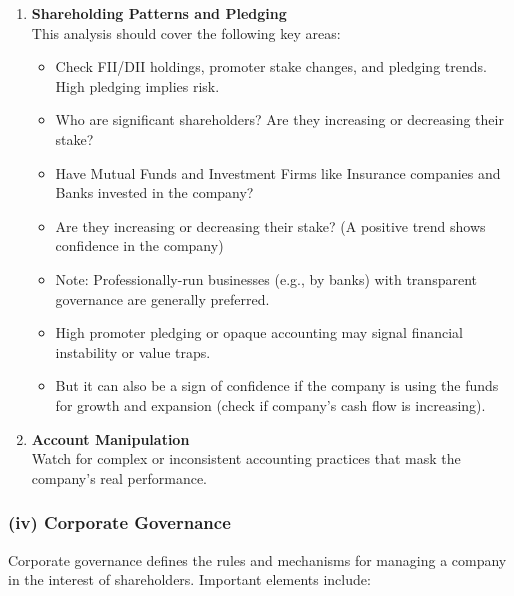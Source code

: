 \documentclass[12pt]{article}
\begin{document}
\begin{enumerate}
    \item \textbf{Shareholding Patterns and Pledging} \\
    This analysis should cover the following key areas:
    \begin{itemize}
      \item Check FII/DII holdings, promoter stake changes, and pledging trends. High pledging implies risk. 
      \item Who are significant shareholders? Are they increasing or decreasing their stake?
      \item Have Mutual Funds and Investment Firms like Insurance companies and Banks invested in the company?
      \item Are they increasing or decreasing their stake? (A positive trend shows confidence in the company)
      \item Note: Professionally-run businesses (e.g., by banks) with transparent governance are generally preferred.
      \item High promoter pledging or opaque accounting may signal financial instability or value traps.
      \item But it can also be a sign of confidence if the company is using the funds for growth and expansion (check if company's cash flow is increasing).
    \end{itemize}
  
    \item \textbf{Account Manipulation} \\
    Watch for complex or inconsistent accounting practices that mask the company's real performance.
\end{enumerate}


\subsubsection*{(iv) Corporate Governance}

Corporate governance defines the rules and mechanisms for managing a company in the interest of shareholders. Important elements include:
\end{document}
